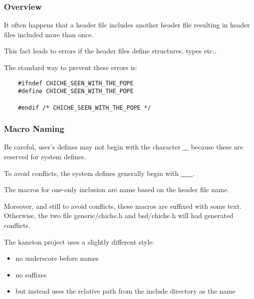 \begin{frame}[containsverbatim]
  \frametitle{Overview}

  It often happens that a header file includes another header file resulting
  in header files included more than once.

  \nl

  This fact leads to errors if the header files define structures, types etc..

  \nl

  The standard way to prevent these errors is:

  \begin{verbatim}
    #ifndef CHICHE_SEEN_WITH_THE_POPE
    #define CHICHE_SEEN_WITH_THE_POPE

    #endif /* CHICHE_SEEN_WITH_THE_POPE */
  \end{verbatim}
\end{frame}


\begin{frame}
  \frametitle{Macro Naming}

  Be careful, user's defines may not begin with the character \textbf{\_}
  because these are reserved for system defines.

  \nl

  To avoid conflicts, the system defines generally begin with \textbf{\_\_}.

  \nl

  The macros for one-only inclusion are name based on the header file name.

  \nl

  Moreover, and still to avoid conflicts, these macros are suffixed with
  some text. Otherwise, the two file generic/chiche.h and bsd/chiche.h
  will had generated conflicts.

  \nl

  The kaneton project uses a slightly different style:

  \begin{itemize}[<+->]
    \item
      no underscore before names
    \item
      no suffixes
    \item
      but instead uses the relative path from the include directory
      as the name
  \end{itemize}

\end{frame}


